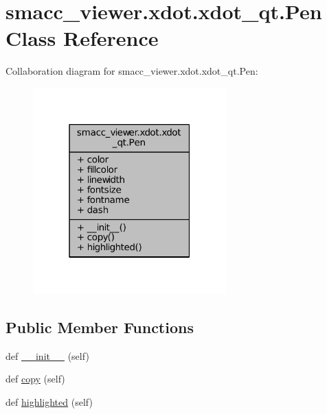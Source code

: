 \hypertarget{classsmacc__viewer_1_1xdot_1_1xdot__qt_1_1Pen}{}\section{smacc\+\_\+viewer.\+xdot.\+xdot\+\_\+qt.\+Pen Class Reference}
\label{classsmacc__viewer_1_1xdot_1_1xdot__qt_1_1Pen}


Collaboration diagram for smacc\+\_\+viewer.\+xdot.\+xdot\+\_\+qt.\+Pen\+:
\nopagebreak
\begin{figure}[H]
\begin{center}
\leavevmode
\includegraphics[width=211pt]{classsmacc__viewer_1_1xdot_1_1xdot__qt_1_1Pen__coll__graph}
\end{center}
\end{figure}
\subsection*{Public Member Functions}
\begin{DoxyCompactItemize}
\item 
def \hyperlink{classsmacc__viewer_1_1xdot_1_1xdot__qt_1_1Pen_af9d1bd065ba129d7ccf19ce6f8922879}{\+\_\+\+\_\+init\+\_\+\+\_\+} (self)
\item 
def \hyperlink{classsmacc__viewer_1_1xdot_1_1xdot__qt_1_1Pen_a4456b808ca309e759d3be54141d03dca}{copy} (self)
\item 
def \hyperlink{classsmacc__viewer_1_1xdot_1_1xdot__qt_1_1Pen_a1a2abcb7f03ab955288e9268f86c8fd1}{highlighted} (self)
\end{DoxyCompactItemize}
